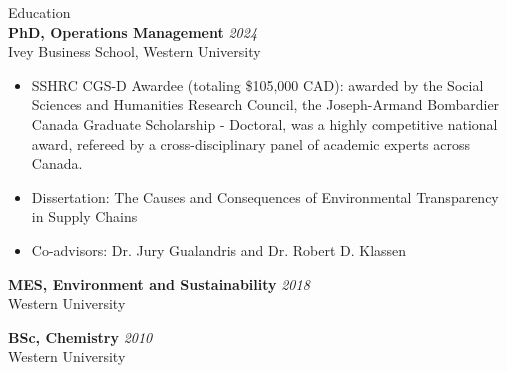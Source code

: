\documentclass{resume} %
\begin{document}
\begin{rSection}{Education}
\ \\
{\bf PhD, Operations Management} \hfill {\em 2024} 
\\ Ivey Business School, Western University

\begin{itemize}
\item SSHRC CGS-D Awardee (totaling \$105,000 CAD): awarded by the Social Sciences and Humanities Research Council, the Joseph-Armand Bombardier Canada Graduate Scholarship - Doctoral, was a highly competitive national award, refereed by a cross-disciplinary panel of academic experts across Canada.
\item Dissertation: The Causes and Consequences of Environmental Transparency in Supply Chains
\item Co-advisors: Dr. Jury Gualandris and Dr. Robert D. Klassen
\\
\end{itemize}

{\bf MES, Environment and Sustainability} \hfill {\em 2018} 
\\ Western University

{\bf BSc, Chemistry} \hfill {\em 2010} 
\\ Western University
\end{rSection}
\newcommand{\docmark}{\textsuperscript{$\star$}}
\end{document}
